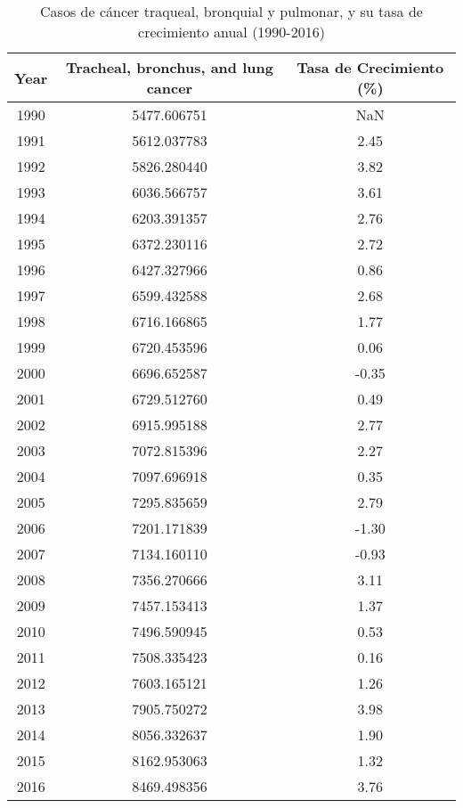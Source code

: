 \begin{table}[h!]
\centering
\begin{tabular}{|c|c|c|}
\hline
\textbf{Year} & \textbf{Tracheal, bronchus, and lung cancer} & \textbf{Tasa de Crecimiento (\%)} \\ \hline
1990 & 5477.606751 & NaN \\ \hline
1991 & 5612.037783 & 2.45 \\ \hline
1992 & 5826.280440 & 3.82 \\ \hline
1993 & 6036.566757 & 3.61 \\ \hline
1994 & 6203.391357 & 2.76 \\ \hline
1995 & 6372.230116 & 2.72 \\ \hline
1996 & 6427.327966 & 0.86 \\ \hline
1997 & 6599.432588 & 2.68 \\ \hline
1998 & 6716.166865 & 1.77 \\ \hline
1999 & 6720.453596 & 0.06 \\ \hline
2000 & 6696.652587 & -0.35 \\ \hline
2001 & 6729.512760 & 0.49 \\ \hline
2002 & 6915.995188 & 2.77 \\ \hline
2003 & 7072.815396 & 2.27 \\ \hline
2004 & 7097.696918 & 0.35 \\ \hline
2005 & 7295.835659 & 2.79 \\ \hline
2006 & 7201.171839 & -1.30 \\ \hline
2007 & 7134.160110 & -0.93 \\ \hline
2008 & 7356.270666 & 3.11 \\ \hline
2009 & 7457.153413 & 1.37 \\ \hline
2010 & 7496.590945 & 0.53 \\ \hline
2011 & 7508.335423 & 0.16 \\ \hline
2012 & 7603.165121 & 1.26 \\ \hline
2013 & 7905.750272 & 3.98 \\ \hline
2014 & 8056.332637 & 1.90 \\ \hline
2015 & 8162.953063 & 1.32 \\ \hline
2016 & 8469.498356 & 3.76 \\ \hline
\end{tabular}
\caption{Casos de cáncer traqueal, bronquial y pulmonar, y su tasa de crecimiento anual (1990-2016)}
\label{table:cancer_growth}
\end{table}

